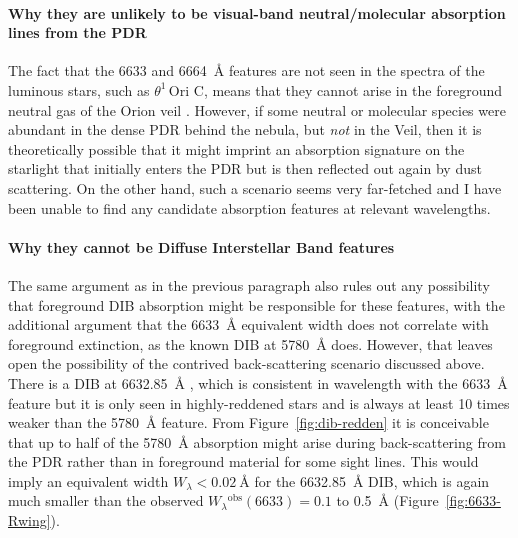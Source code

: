 \documentclass[useAMS, usenatbib, a4paper]{mnras}
\def\th#1#2{\ensuremath{\theta^{#1}\,\text{Ori~#2}}}
\newcommand\observed{\ensuremath{^{\text{obs}}}}
\begin{document}
\paragraph*{Why they are unlikely to be visual-band
  neutral/molecular absorption lines from the PDR}
\label{sec:cannot-be-abs}

The fact that the \num{6633} and \SI{6664}{\angstrom} features are not seen
in the spectra of the luminous stars, such as \th1C,
means that they cannot arise in the foreground neutral gas of the Orion veil
\citep{Abel:2004a, Abel:2019a}.
However, if some neutral or molecular species were abundant in the dense PDR behind the nebula,
but \emph{not} in the Veil,
then it is theoretically possible that it might imprint an absorption signature
on the starlight that initially enters the PDR but is then reflected out again
by dust scattering.
On the other hand,
such a scenario seems very far-fetched and I have been unable to find
any candidate absorption features at relevant wavelengths.

\paragraph*{Why they cannot be Diffuse Interstellar Band features}
\label{sec:cannot-be-solid}

The same argument as in the previous paragraph also rules out any possibility
that foreground DIB absorption might be responsible for these features,
with the additional argument that the \SI{6633}{\angstrom}
equivalent width does not correlate with foreground extinction,
as the known DIB at \SI{5780}{\angstrom} does.
However, that leaves open the possibility of the contrived back-scattering scenario discussed above. 
There is a DIB at \SI{6632.85}{\angstrom} \citep{Galazutdinov:2000a},
which is consistent in wavelength with the \SI{6633}{\angstrom} feature
but it is only seen in highly-reddened stars
and is always at least 10 times weaker than the \SI{5780}{\angstrom} feature.
From Figure~\ref{fig:dib-redden} it is conceivable that up to half of the
\SI{5780}{\angstrom} absorption might arise during back-scattering from the PDR rather than in foreground material for some sight lines. 
This would imply an equivalent width \(W_\lambda < \SI{0.02}{\angstrom}\)
for the \SI{6632.85}{\angstrom} DIB,
which is again much smaller than the observed \(W_\lambda\observed(6633) = 0.1\)
to \SI{0.5}{\angstrom} (Figure~\ref{fig:6633-Rwing}).


\end{document}

